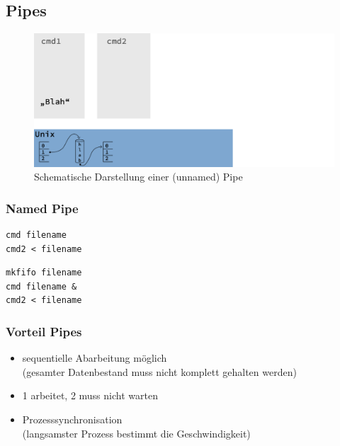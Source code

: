 	\subsection{Pipes} %
	\label{sub:pipes}
	
		\begin{figure}[ht]
			\caption{Schematische Darstellung einer (unnamed) Pipe}
			\includegraphics[width=\textwidth]{workfiles/v4_1}
		\end{figure}

		\subsubsection*{Named Pipe} %
		\label{ssub:named_pipe}

			\lstShell[Variante 1]
			\begin{lstlisting}
cmd filename
cmd2 < filename
			\end{lstlisting}

			\lstShell[Variante 2]
			\begin{lstlisting}
mkfifo filename
cmd filename &
cmd2 < filename
			\end{lstlisting}


		\subsubsection*{Vorteil Pipes} %
		\label{ssub:vorteil_pipes}
		
			\begin{itemize}
				\item sequentielle Abarbeitung möglich\\
						(gesamter Datenbestand muss nicht komplett gehalten werden)
				\item 1 arbeitet, 2 muss nicht warten
				\item Prozesssynchronisation\\
						(langsamster Prozess bestimmt die Geschwindigkeit)
			\end{itemize}

